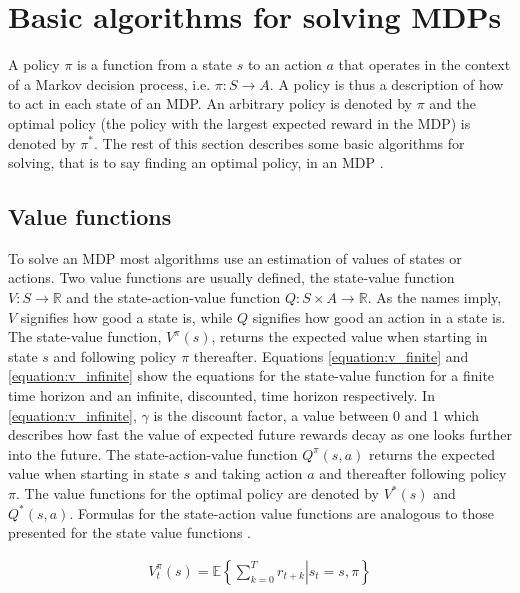 \section{Basic algorithms for solving MDPs}

A policy $\pi$ is a function from a state $s$ to an action $a$ that operates in
the context of a Markov decision process, i.e. $\pi \colon S \to A$. A policy
is thus a description of how to act in each state of an MDP. An arbitrary
policy is denoted by $\pi$ and the optimal policy (the policy with the largest
expected reward in the MDP) is denoted by $\pi^*$. The rest of this section
describes some basic algorithms for solving, that is to say finding an optimal
policy, in an MDP \parencite{barto1998reinforcement}.

\subsection{Value functions}

To solve an MDP most algorithms use an estimation of values of states or
actions. Two value functions are usually defined, the state-value function $V :
S \to \mathbb R$ and the state-action-value function $Q : S \times A \to
\mathbb R$. As the names imply, $V$ signifies how good a state is, while $Q$
signifies how good an action in a state is. The state-value function,
$V^\pi(s)$, returns the expected value when starting in state $s$ and following
policy $\pi$ thereafter. Equations \eqref{equation:v_finite} and \eqref{equation:v_infinite} show the equations for the state-value function for a finite time horizon and an infinite, discounted, time horizon respectively. In \eqref{equation:v_infinite}, $\gamma$ is the discount factor, a value between 0 and 1 which describes how fast the value of expected future rewards decay as one looks further into the future. The state-action-value function $Q^\pi(s, a)$ returns
the expected value when starting in state $s$ and taking action $a$ and
thereafter following policy $\pi$. The value functions for the optimal policy
are denoted by $V^*(s)$ and $Q^*(s, a)$. Formulas for the state-action value functions are analogous to those presented for the state value functions \parencite{barto1998reinforcement}. 

\begin{align}
\label{equation:v_finite}
V_t^\pi(s) = \mathbb{E} \left\{\left. \sum^{T}_{k=0} r_{t+k} \right\vert s_t = s, \pi \right\}
\end{align}

